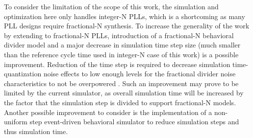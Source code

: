 To consider the limitation of the scope of this work, the simulation and optimization here only handles integer-N PLLs, which is a shortcoming as many PLL designs require fractional-N synthesis. To increase the generality of the work by extending to fractional-N PLLs, introduction of a fractional-N behavioral divider model and a major decrease in simulation time step size (much smaller than the reference cycle time used in integer-N case of this work) is a possible improvement. Reduction of the time step is required to decrease simulation time-quantization noise effects to low enough levels for the fractional divider noise characteristics to not be overpowered \cite{perrott_2002_sim}. Such an improvement may prove to be limited by the current simulator, as overall simulation time will be increased by the factor that the simulation step is divided to support fractional-N models. Another possible improvement to consider is the implementation of a non-uniform step event-driven behavioral simulator to reduce simulation steps and thus simulation time.

\FloatBarrier
